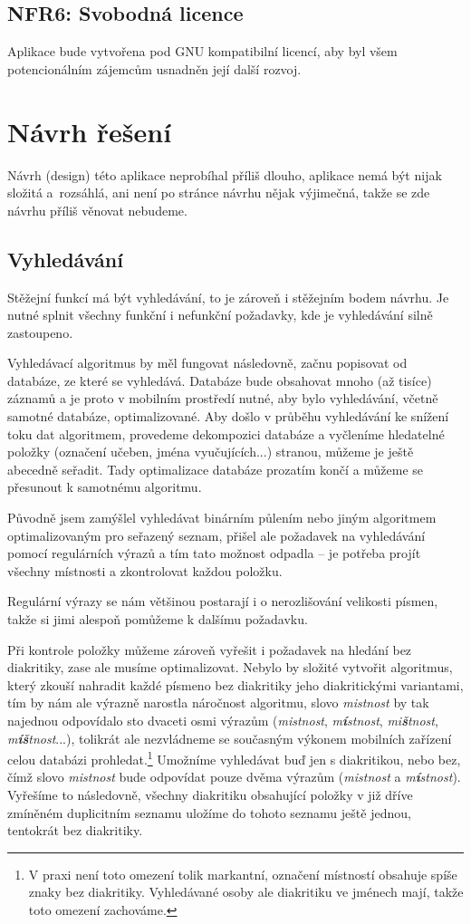 \subsection{NFR6: Svobodná licence}
Aplikace bude vytvořena pod GNU kompatibilní licencí, aby byl všem potencionálním zájemcům usnadněn její další rozvoj.



\section{Návrh řešení}
Návrh (design) této aplikace neprobíhal příliš dlouho, aplikace nemá být nijak složitá a~rozsáhlá, ani není po stránce návrhu nějak výjimečná, takže se zde návrhu příliš věnovat nebudeme.

\subsection{Vyhledávání}
Stěžejní funkcí má být vyhledávání, to je zároveň i stěžejním bodem návrhu. Je nutné splnit všechny funkční i nefunkční požadavky, kde je vyhledávání silně zastoupeno.

Vyhledávací algoritmus by měl fungovat následovně, začnu popisovat od databáze, ze které se vyhledává. Databáze bude obsahovat mnoho (až tisíce) záznamů a je proto v mobilním prostředí nutné, aby bylo vyhledávání, včetně samotné databáze, optimalizované. Aby došlo v průběhu vyhledávání ke snížení toku dat algoritmem, provedeme dekompozici databáze a vyčleníme hledatelné položky (označení učeben, jména vyučujících...) stranou, můžeme je ještě abecedně seřadit. Tady optimalizace databáze prozatím končí a můžeme se přesunout k samotnému algoritmu.

Původně jsem zamýšlel vyhledávat binárním půlením nebo jiným algoritmem optimalizovaným pro seřazený seznam, přišel ale požadavek na vyhledávání pomocí regulárních výrazů a tím tato možnost odpadla -- je potřeba projít všechny místnosti a zkontrolovat každou položku.

Regulární výrazy se nám většinou postarají i o nerozlišování velikosti písmen, takže si jimi alespoň pomůžeme k dalšímu požadavku.

Při kontrole položky můžeme zároveň vyřešit i požadavek na hledání bez diakritiky, zase ale musíme optimalizovat. Nebylo by složité vytvořit algoritmus, který zkouší nahradit každé písmeno bez diakritiky jeho diakritickými variantami, tím by nám ale výrazně narostla náročnost algoritmu, slovo \emph{mistnost} by tak najednou odpovídalo sto dvaceti osmi výrazům (\emph{mistnost}, \emph{m\textbf{í}stnost}, \emph{mi\textbf{š}tnost}, \emph{m\textbf{íš}tnost}...), tolikrát ale nezvládneme se současným výkonem mobilních zařízení celou databázi prohledat.\footnote{V praxi není toto omezení tolik markantní, označení místností obsahuje spíše znaky bez diakritiky. Vyhledávané osoby ale diakritiku ve jménech mají, takže toto omezení zachováme.} Umožníme vyhledávat buď jen s diakritikou, nebo bez, čímž slovo \emph{mistnost} bude odpovídat pouze dvěma výrazům (\emph{mistnost} a \emph{m\textbf{í}stnost}). Vyřešíme to následovně, všechny diakritiku obsahující položky v již dříve zmíněném duplicitním seznamu uložíme do tohoto seznamu ještě jednou, tentokrát bez diakritiky.

